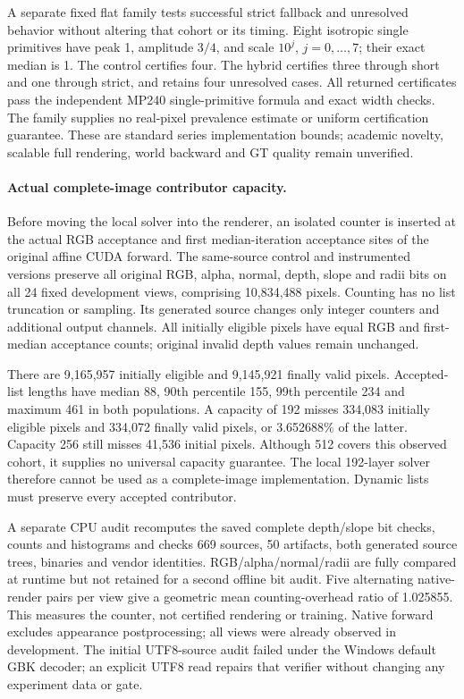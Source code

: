 \documentclass[11pt,a4paper]{article}
\begin{document}
A separate fixed flat family tests successful strict fallback and unresolved
behavior without altering that cohort or its timing. Eight isotropic single
primitives have peak 1, amplitude $3/4$, and scale $10^j$, $j=0,\ldots,7$;
their exact median is 1. The control certifies four. The hybrid certifies
three through short and one through strict, and retains four unresolved
cases. All returned certificates pass the independent MP240 single-primitive
formula and exact width checks. The family supplies no real-pixel prevalence
estimate or uniform certification guarantee. These are standard series
implementation bounds; academic novelty, scalable full rendering, world
backward and GT quality remain unverified.

\paragraph{Actual complete-image contributor capacity.}
Before moving the local solver into the renderer, an isolated counter is
inserted at the actual RGB acceptance and first median-iteration acceptance
sites of the original affine CUDA forward. The same-source control and
instrumented versions preserve all original RGB, alpha, normal, depth,
slope and radii bits on all 24 fixed development views, comprising
10,834,488 pixels. Counting has no list truncation or sampling. Its generated
source changes only integer counters and additional output channels.
All initially eligible pixels have equal RGB and first-median acceptance
counts; original invalid depth values remain unchanged.

There are 9,165,957 initially eligible and 9,145,921 finally valid pixels.
Accepted-list lengths have median 88, 90th percentile 155, 99th percentile
234 and maximum 461 in both populations. A capacity of 192 misses 334,083
initially eligible pixels and 334,072 finally valid pixels, or 3.652688\%
of the latter. Capacity 256 still misses 41,536 initial pixels. Although 512
covers this observed cohort, it supplies no universal capacity guarantee.
The local 192-layer solver therefore cannot be used as a complete-image
implementation. Dynamic lists must preserve every accepted contributor.

A separate CPU audit recomputes the saved complete depth/slope bit checks,
counts and histograms and checks 669 sources, 50 artifacts, both generated
source trees, binaries and vendor identities. RGB/alpha/normal/radii are
fully compared at runtime but not retained for a second offline bit audit.
Five alternating native-render pairs per view give a geometric mean
counting-overhead ratio of 1.025855. This measures the counter, not certified
rendering or training. Native forward excludes appearance postprocessing;
all views were already observed in development. The initial UTF8-source
audit failed under the Windows default GBK decoder; an explicit UTF8 read
repairs that verifier without changing any experiment data or gate.
\end{document}
